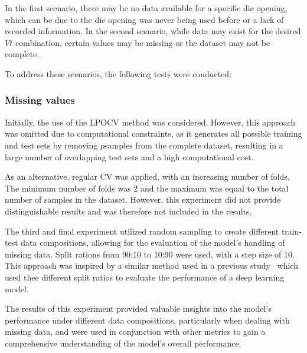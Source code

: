 In the first scenario, there may be no data available for a specific die
opening, which can be due to the die opening was never being used before or a
lack of recorded
information.
In the second scenario, while data may exist for the desired \(Vt\)
combination, certain values may
be missing or the dataset may not be complete.

To address these scenarios, the following tests were conducted:

\subsubsection{Missing values}

Initially, the use of the \ac{LPOCV} method was considered.
However, this approach was omitted due to computational constraints, as it generates all possible
training and test sets by removing \(p\)samples from the complete dataset, resulting in a large
number of overlapping test sets and a high computational cost.

As an alternative, regular \ac{CV} was applied, with an increasing number of folds.
The minimum number of folds was 2 and the maximum was equal to the total number of samples in the
dataset.
However, this experiment did not provide distinguishable results and was therefore not
included in the results.

The third and final experiment utilized random sampling to create different train-
test data compositions, allowing for the evaluation of the model's handling of missing data.
Split rations from 90:10 to 10:90 were used, with a step size of 10. This approach was inspired by a
similar method used in a previous study~\cite[p. 570--574]{liu2021deep}  which used thee different
split ratios to evaluate the performance of a deep learning model.


The results of this experiment provided valuable insights into the model's performance under
different data compositions, particularly when dealing with missing
data, and were used in conjunction with other metrics to gain a comprehensive understanding of
the model's overall performance.

